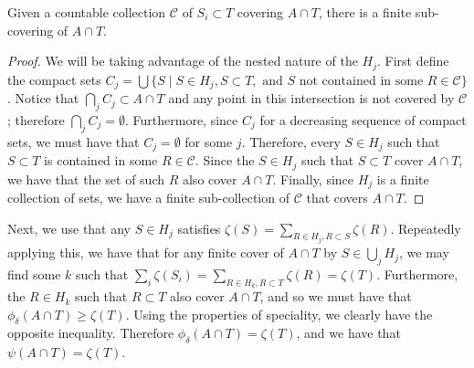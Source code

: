 \begin{lemma}
Given a countable collection \(\mathcal C\) of \(S_i \subset T\) covering \(A \cap T\), there is a
finite sub-covering of
\(A \cap T\).
\end{lemma}
\begin{proof}
We will be taking advantage of the nested nature of the \(H_j\). First define the compact sets
\(C_j = \bigcup \{S \mid S \in H_j, S \subset T, \text{ and } S \text{ not contained in some } R\in\mathcal C\}\).
Notice that 
\(\bigcap_j C_j \subset A \cap T\) and any point in this intersection is not covered by \(\mathcal C\);
therefore \(\bigcap_j C_j = \emptyset\). Furthermore, since \(C_j\) for a decreasing sequence of compact sets,
we must have that \(C_j = \emptyset\) for some \(j\). Therefore, every \(S\in H_j\) such that \(S\subset T\) is
contained in some \(R\in\mathcal C\). Since the \(S \in H_j\) such that \(S\subset T\) cover \(A\cap T\), we have
that the set of such \(R\) also cover \(A\cap T\). Finally, since \(H_j\) is a finite collection of sets, we have
a finite sub-collection of \(\mathcal C\) that covers \(A \cap T\). 
\end{proof}

Next, we use that any \(S \in H_j\) satisfies \(\zeta(S) = \sum\limits_{R\in H_j, R \subset S} \zeta(R)\). 
Repeatedly applying this, we have that for
any finite cover of \(A\cap T\) by \(S \in \bigcup_j H_j\), we may find some \(k\) such that
\(\sum_i\zeta(S_i) = \sum\limits_{R \in H_k, R\subset T} \zeta(R) = \zeta(T)\). Furthermore, the \(R\in H_k\)
such that \(R \subset T\) also cover \(A \cap T\), and so we must have that \(\phi_\delta(A\cap T) \geq \zeta(T)\). 
Using the properties of speciality, we clearly have the opposite 
inequality. Therefore \(\phi_\delta(A\cap T) = \zeta(T)\), and we have that \(\psi(A\cap T) = \zeta(T)\).
